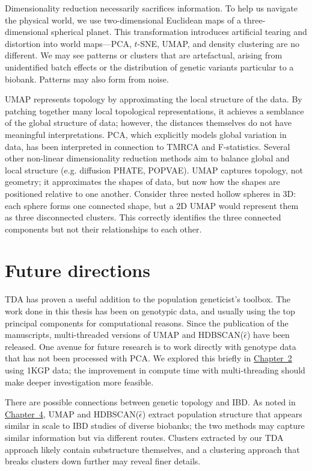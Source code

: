 Dimensionality reduction necessarily sacrifices information. To help us navigate the physical world, we use two-dimensional Euclidean maps of a three-dimensional spherical planet. This transformation introduces artificial tearing and distortion into world maps---PCA, $t$-SNE, UMAP, and density clustering are no different. We may see patterns or clusters that are artefactual, arising from unidentified batch effects or the distribution of genetic variants particular to a biobank. Patterns may also form from noise. 

UMAP represents topology by approximating the local structure of the data. By patching together many local topological representations, it achieves a semblance of the global structure of data; however, the distances themselves do not have meaningful interpretations. PCA, which explicitly models global variation in data, has been interpreted in connection to TMRCA and F-statistics\citep{mcvean2009genealogical,peter_geometric_2022}. Several other non-linear dimensionality reduction methods aim to balance global and local structure (e.g. diffusion PHATE\citep{moon2019visualizing}, POPVAE\citep{battey_visualizing_2021}). UMAP captures topology, not geometry; it approximates the shapes of data, but now how the shapes are positioned relative to one another. Consider three nested hollow spheres in $3$D: each sphere forms one connected shape, but a $2$D UMAP would represent them as three disconnected clusters\citep{herrmann_enhancing_2022}. This correctly identifies the three connected components but not their relationships to each other.

\section{Future directions}

TDA has proven a useful addition to the population geneticist's toolbox. The work done in this thesis has been on genotypic data, and usually using the top principal components for computational reasons. Since the publication of the manuscripts, multi-threaded versions of UMAP and HDBSCAN($\hat{\epsilon}$) have been released. One avenue for future research is to work directly with genotype data that has not been processed with PCA. We explored this briefly in \hyperref[chap:chapter2]{Chapter~2} using 1KGP data; the improvement in compute time with multi-threading should make deeper investigation more feasible.

There are possible connections between genetic topology and IBD. As noted in \hyperref[chap:chapter4]{Chapter~4}, UMAP and HDBSCAN($\hat{\epsilon}$) extract population structure that appears similar in scale to IBD studies of diverse biobanks; the two methods may capture similar information but via different routes. Clusters extracted by our TDA approach likely contain substructure themselves, and a clustering approach that breaks clusters down further may reveal finer details.

